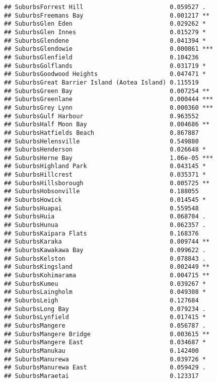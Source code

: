 \documentclass[
]{article}
\begin{document}
\begin{verbatim}
## SuburbsForrest Hill                        0.059527 .  
## SuburbsFreemans Bay                        0.001217 ** 
## SuburbsGlen Eden                           0.029262 *  
## SuburbsGlen Innes                          0.015279 *  
## SuburbsGlendene                            0.041394 *  
## SuburbsGlendowie                           0.000861 ***
## SuburbsGlenfield                           0.104236    
## SuburbsGolflands                           0.031719 *  
## SuburbsGoodwood Heights                    0.047471 *  
## SuburbsGreat Barrier Island (Aotea Island) 0.115519    
## SuburbsGreen Bay                           0.007254 ** 
## SuburbsGreenlane                           0.000444 ***
## SuburbsGrey Lynn                           0.000360 ***
## SuburbsGulf Harbour                        0.963552    
## SuburbsHalf Moon Bay                       0.004686 ** 
## SuburbsHatfields Beach                     0.867887    
## SuburbsHelensville                         0.549880    
## SuburbsHenderson                           0.026648 *  
## SuburbsHerne Bay                           1.06e-05 ***
## SuburbsHighland Park                       0.043145 *  
## SuburbsHillcrest                           0.035371 *  
## SuburbsHillsborough                        0.005725 ** 
## SuburbsHobsonville                         0.188055    
## SuburbsHowick                              0.014545 *  
## SuburbsHuapai                              0.559548    
## SuburbsHuia                                0.068704 .  
## SuburbsHunua                               0.062357 .  
## SuburbsKaipara Flats                       0.168376    
## SuburbsKaraka                              0.009744 ** 
## SuburbsKawakawa Bay                        0.099622 .  
## SuburbsKelston                             0.078843 .  
## SuburbsKingsland                           0.002449 ** 
## SuburbsKohimarama                          0.004715 ** 
## SuburbsKumeu                               0.039267 *  
## SuburbsLaingholm                           0.049308 *  
## SuburbsLeigh                               0.127684    
## SuburbsLong Bay                            0.079234 .  
## SuburbsLynfield                            0.017415 *  
## SuburbsMangere                             0.056787 .  
## SuburbsMangere Bridge                      0.003615 ** 
## SuburbsMangere East                        0.034687 *  
## SuburbsManukau                             0.142400    
## SuburbsManurewa                            0.039726 *  
## SuburbsManurewa East                       0.059429 .  
## SuburbsMaraetai                            0.123317    

\end{verbatim}
\end{document}
